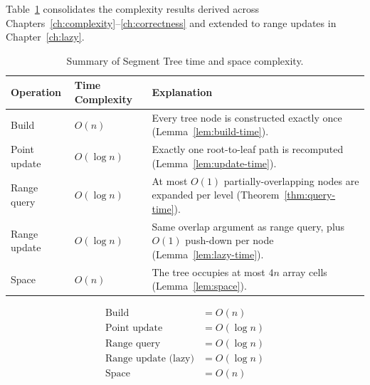 \documentclass[
  11pt,
  a4paper,
  twoside=false,
  numbers=noenddot,
  headings=big,
  parskip=half,
  toc=bibliography,
  toc=listof,
  bibliography=totoc
]{scrreprt}
\newcommand{\Oh}[1]{O\!\left(#1\right)}
\newcommand{\tblhead}[1]{\textbf{\sffamily #1}}
\begin{document}
Table~\ref{tab:summary} consolidates the complexity results derived across Chapters~\ref{ch:complexity}--\ref{ch:correctness} and extended to range updates in Chapter~\ref{ch:lazy}.

\begin{table}[H]
\centering
\caption{Summary of Segment Tree time and space complexity.}
\label{tab:summary}
\begin{tabular}{llp{6.2cm}}
\toprule
\tblhead{Operation} & \tblhead{Time Complexity} & \tblhead{Explanation} \\
\midrule
Build          & $\Oh{n}$      & Every tree node is constructed exactly once (Lemma~\ref{lem:build-time}). \\
Point update   & $\Oh{\log n}$ & Exactly one root-to-leaf path is recomputed (Lemma~\ref{lem:update-time}). \\
Range query    & $\Oh{\log n}$ & At most $\Oh{1}$ partially-overlapping nodes are expanded per level (Theorem~\ref{thm:query-time}). \\
Range update   & $\Oh{\log n}$ & Same overlap argument as range query, plus $\Oh{1}$ push-down per node (Lemma~\ref{lem:lazy-time}). \\
Space          & $\Oh{n}$      & The tree occupies at most $4n$ array cells (Lemma~\ref{lem:space}). \\
\bottomrule
\end{tabular}
\end{table}

\begin{equation}
\boxed{
\begin{aligned}
\text{Build} &= \Oh{n} \\
\text{Point update} &= \Oh{\log n} \\
\text{Range query} &= \Oh{\log n} \\
\text{Range update (lazy)} &= \Oh{\log n} \\
\text{Space} &= \Oh{n}
\end{aligned}}
\end{equation}
\end{document}
